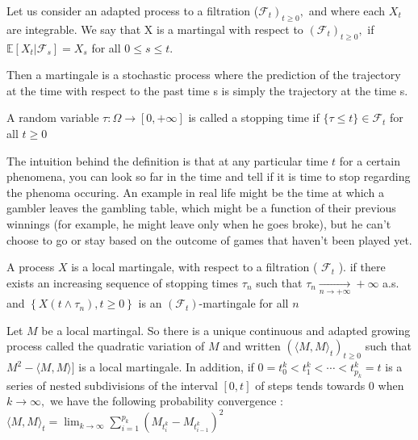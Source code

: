 	Let us consider an adapted process to a filtration ($\left.\mathcal{F}_{t}\right)_{t \geq 0},$ and where each $X_t$ are integrable.
	We say that X is a martingal with respect to $\left(\mathcal{F}_{t}\right)_{t \geq 0},$ if  $\mathbb{E}[X_{t} | \mathcal{F}_{s}]=X_{s}$ for all $0 \leq s \leq t$.

	Then a martingale is a stochastic process where the prediction of the trajectory at the time  with respect to the past time s is simply the trajectory at the time s.

	\begin{definition}
		A random variable $\tau: \Omega \rightarrow[0,+\infty]$ is called a stopping time if $\{\tau \leq t\} \in \mathcal{F}_{t}$ for all $t \geq 0$
	\end{definition}

	The intuition behind the definition is that at any particular time $t$ for a certain phenomena, you can look so far in the time and tell if it is time to stop regarding the phenoma occuring.
	An example in real life might be the time at which a gambler leaves the gambling table, which might be a function of their previous winnings (for example, he might leave only when he goes broke), but he can't choose to go or stay based on the outcome of games that haven't been played yet.


	\begin{definition}

		A process $X$ is a local martingale, with respect to a filtration ( $\mathcal{F}_{t}$ ). if there exists an increasing sequence of stopping times $\tau_{n}$ such that $\tau_{n} \underset{n \rightarrow+\infty}{\longrightarrow}+\infty$
		a.s. and $\left\{X\left(t \wedge \tau_{n}\right), t \geq 0\right\}$ is an
		$\left(\mathcal{F}_{t}\right)$-martingale for all $n$

	\end{definition}
	\begin{theorem}
		Let $M$ be a local martingal. So there is a unique continuous and adapted growing process called the quadratic variation of $M$ and written $\left(\langle M, M\rangle_{t}\right)_{t \geq 0}$ such that $M^{2}-\langle M, M\rangle]$ is a local martingale. In addition, if $0=t_{0}^{k}<t_{1}^{k}<\cdots<t_{p_{k}}^{k}=t$
		is a series of nested subdivisions of the interval $[0, t]$ of steps tends towards 0 when $k \rightarrow \infty,$ we have the following probability convergence :
		$\langle M, M\rangle_{t}=\lim _{k \rightarrow \infty} \sum_{i=1}^{p_{k}}\left(M_{t_{i}^{k}}-M_{t_{i-1}^{k}}\right)^{2}$
	\end{theorem}


